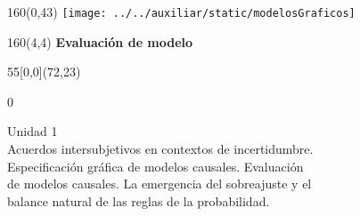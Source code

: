 \documentclass[shownotes,aspectratio=169]{beamer}
\begin{document}
\begin{frame}
\begin{textblock}{160}(0,43)
\texttt{[image: ../../auxiliar/static/modelosGraficos]}
\end{textblock}


\begin{textblock}{160}(4,4)
\LARGE \textcolor{black!85}{\fontsize{22}{0}\selectfont \textbf{Evaluación de modelo}}
\end{textblock}


\begin{textblock}{55}[0,0](72,23)
\begin{turn}{0}
\parbox{10cm}{\sloppy\setlength\parfillskip{0pt}
\textcolor{black!85}{Unidad 1} \\
\small\textcolor{black!85}{Acuerdos intersubjetivos en contextos de incertidumbre.} \\
\small\textcolor{black!85}{Especificación gráfica de modelos causales. Evaluación} \\
\small\textcolor{black!85}{de modelos causales. La emergencia del sobreajuste y el} \\
\small\textcolor{black!85}{balance natural de las reglas de la probabilidad.} \\
}
\end{turn}
\end{textblock}

\end{frame}
\end{document}

